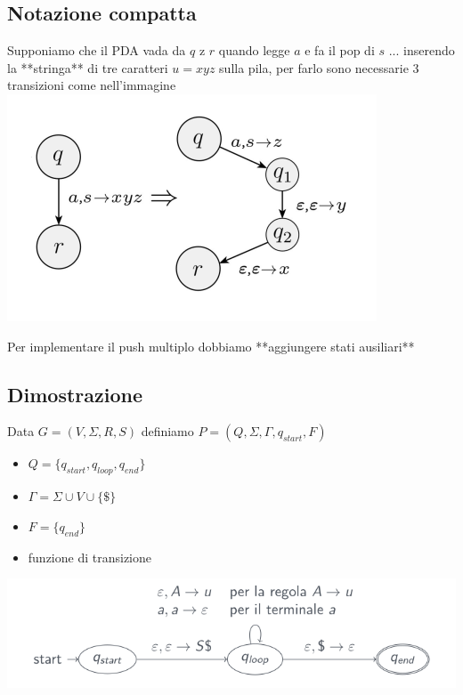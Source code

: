 \subsection{Notazione compatta}
Supponiamo che il PDA vada da $q$ z $r$ quando legge $a$ e fa il pop di $s$ 
... inserendo la **stringa** di tre caratteri $u=xyz$ sulla pila, per farlo sono necessarie 3 transizioni come nell'immagine 
\includegraphics[scale=0.5]{img/notazione_compatta.png}

Per implementare il push multiplo dobbiamo **aggiungere stati ausiliari**  

\subsection{Dimostrazione}
Data $G=(V,\Sigma, R, S)$ definiamo $P=(Q,\Sigma,\Gamma,q_{start},F)$ 
\begin{itemize}
	\item $Q=\{q_{start}, q_{loop}, q_{end}\}$ 
	\item $\Gamma = \Sigma \cup V \cup \{\$\}$ 
	\item $F=\{q_{end}\}$ 
	\item funzione di transizione
\end{itemize}
\includegraphics[scale=0.5]{img/dimostrazione_pda.png}

